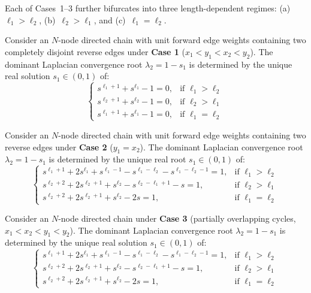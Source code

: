 \documentclass[openright,twoside]{iitbthesis}
\begin{document}
Each of Cases~1--3 further bifurcates into three length-dependent regimes: (a)~$\ell_1 > \ell_2$, (b)~$\ell_2 > \ell_1$, and (c)~$\ell_1 = \ell_2$. 
\begin{theo}\label{Theoremcase1}
Consider an $N$-node directed chain with unit forward edge weights containing two completely disjoint reverse edges under \textbf{Case 1} ($x_1 < y_1 < x_2 < y_2$). The dominant Laplacian convergence root $\lambda_2 = 1 - s_1$ is determined by the unique real solution $s_1 \in (0,1)$ of:
\begin{equation}\label{eq:case1_theorem_statement}
	\begin{cases}
		s^{\ell_1+1} + s^{\ell_1} - 1 = 0, & \text{if } \ell_1 > \ell_2 \\
		s^{\ell_2+1} + s^{\ell_2} - 1 = 0, & \text{if } \ell_2 > \ell_1 \\
		s^{\ell_1+1} + s^{\ell_1} - 1 = 0, & \text{if } \ell_1 = \ell_2
	\end{cases}
\end{equation}
\end{theo}
\begin{theo}\label{Theoremcase2}
Consider an $N$-node directed chain with unit forward edge weights containing two reverse edges under \textbf{Case 2} ($y_1 = x_2$). The dominant Laplacian convergence root $\lambda_2 = 1 - s_1$ is determined by the unique real root $s_1 \in (0,1)$ of:
\begin{equation}\label{eq:case2_theorem_statement}
	\begin{cases}
		s^{\ell_1+1} + 2s^{\ell_1} + s^{\ell_1-1} - s^{\ell_1-\ell_2} - s^{\ell_1-\ell_2-1} = 1, & \text{if } \ell_1 > \ell_2 \\
		s^{\ell_2+2} + 2s^{\ell_2+1} + s^{\ell_2} - s^{\ell_2-\ell_1+1} - s = 1, & \text{if } \ell_2 > \ell_1 \\
		s^{\ell_2+2} + 2s^{\ell_2+1} + s^{\ell_2} - 2s = 1, & \text{if } \ell_1 = \ell_2
	\end{cases}
\end{equation}
\end{theo}
\begin{theo}\label{theo9}
Consider an $N$-node directed chain under \textbf{Case 3} (partially overlapping cycles, $x_1 < x_2 < y_1 < y_2$). The dominant Laplacian convergence root $\lambda_2 = 1 - s_1$ is determined by the unique real solution $s_1 \in (0,1)$ of:
\begin{equation}
	\begin{cases}
		s^{\ell_1+1} + 2s^{\ell_1} + s^{\ell_1-1} - s^{\ell_1-\ell_2} - s^{\ell_1-\ell_2-1} = 1, & \text{if } \ell_1 > \ell_2 \\
		s^{\ell_2+2} + 2s^{\ell_2+1} + s^{\ell_2} - s^{\ell_2-\ell_1+1} - s = 1, & \text{if } \ell_2 > \ell_1 \\
		s^{\ell_2+2} + 2s^{\ell_2+1} + s^{\ell_2} - 2s = 1, & \text{if } \ell_1 = \ell_2
	\end{cases}
\end{equation}
\end{theo}
\end{document}
